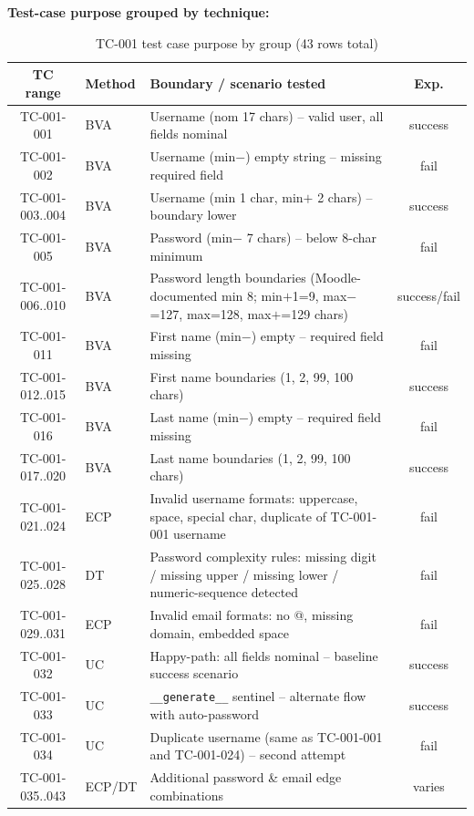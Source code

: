 \documentclass[twoside,final]{hcmut-report}
\begin{document}
\textbf{Test-case purpose grouped by technique:}
\begin{table}[H]
\centering
\renewcommand{\arraystretch}{1.2}
\begin{tabularx}{\textwidth}{|c|l|X|c|}
\hline
\textbf{TC range} & \textbf{Method} & \textbf{Boundary / scenario tested} & \textbf{Exp.} \\ \hline
TC-001-001 & BVA & Username (nom 17 chars) -- valid user, all fields nominal & success \\ \hline
TC-001-002 & BVA & Username (min$-$) empty string -- missing required field & fail \\ \hline
TC-001-003..004 & BVA & Username (min 1 char, min$+$ 2 chars) -- boundary lower & success \\ \hline
TC-001-005 & BVA & Password (min$-$ 7 chars) -- below 8-char minimum & fail \\ \hline
TC-001-006..010 & BVA & Password length boundaries (Moodle-documented min 8; min$+$1=9, max$-$=127, max=128, max$+$=129 chars) & success/fail \\ \hline
TC-001-011 & BVA & First name (min$-$) empty -- required field missing & fail \\ \hline
TC-001-012..015 & BVA & First name boundaries (1, 2, 99, 100 chars) & success \\ \hline
TC-001-016 & BVA & Last name (min$-$) empty -- required field missing & fail \\ \hline
TC-001-017..020 & BVA & Last name boundaries (1, 2, 99, 100 chars) & success \\ \hline
TC-001-021..024 & ECP & Invalid username formats: uppercase, space, special char, duplicate of TC-001-001 username & fail \\ \hline
TC-001-025..028 & DT & Password complexity rules: missing digit / missing upper / missing lower / numeric-sequence detected & fail \\ \hline
TC-001-029..031 & ECP & Invalid email formats: no @, missing domain, embedded space & fail \\ \hline
TC-001-032 & UC & Happy-path: all fields nominal -- baseline success scenario & success \\ \hline
TC-001-033 & UC & \texttt{\_\_generate\_\_} sentinel -- alternate flow with auto-password & success \\ \hline
TC-001-034 & UC & Duplicate username (same as TC-001-001 and TC-001-024) -- second attempt & fail \\ \hline
TC-001-035..043 & ECP/DT & Additional password \& email edge combinations & varies \\ \hline
\end{tabularx}
\caption{TC-001 test case purpose by group (43 rows total)}
\end{table}
\end{document}
